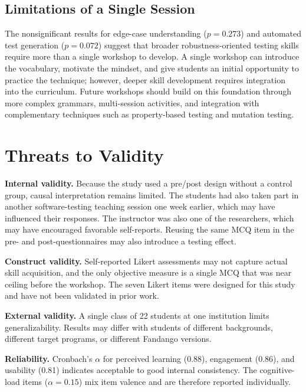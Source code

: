 \documentclass[conference]{IEEEtran}
\begin{document}
\subsection{Limitations of a Single Session}

The nonsignificant results for edge-case understanding ($p = 0.273$) and automated test generation ($p = 0.072$) suggest that broader robustness-oriented testing skills require more than a single workshop to develop.
A single workshop can introduce the vocabulary, motivate the mindset, and give students an initial opportunity to practice the technique; however, deeper skill development requires integration into the curriculum.
Future workshops should build on this foundation through more complex grammars, multi-session activities, and integration with complementary techniques such as property-based testing and mutation testing.

\section{Threats to Validity}
\label{sec:threats}

\textbf{Internal validity.}
Because the study used a pre/post design without a control group, causal interpretation remains limited.
The students had also taken part in another software-testing teaching session one week earlier, which may have influenced their responses.
The instructor was also one of the researchers, which may have encouraged favorable self-reports.
Reusing the same MCQ item in the pre- and post-questionnaires may also introduce a testing effect.

\textbf{Construct validity.}
Self-reported Likert assessments may not capture actual skill acquisition, and the only objective measure is a single MCQ that was near ceiling before the workshop.
The seven Likert items were designed for this study and have not been validated in prior work.

\textbf{External validity.}
A single class of 22 students at one institution limits generalizability.
Results may differ with students of different backgrounds, different target programs, or different Fandango versions.

\textbf{Reliability.}
Cronbach's $\alpha$ for perceived learning (0.88), engagement (0.86), and usability (0.81) indicates acceptable to good internal consistency.
The cognitive-load items ($\alpha = 0.15$) mix item valence and are therefore reported individually.
\end{document}
